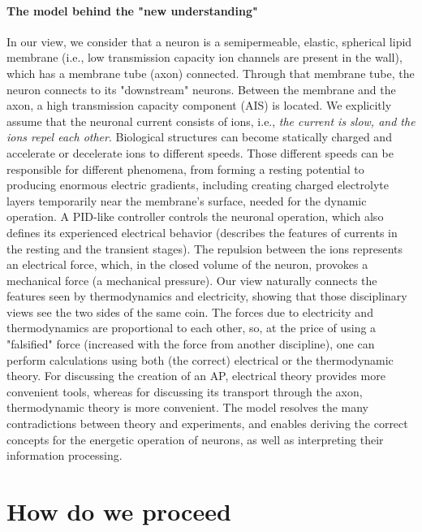 \paragraph*{The model behind the "new understanding"}
In our view, we consider that a neuron is a semipermeable, elastic, spherical lipid membrane
(i.e., low transmission capacity ion channels are present in the wall), which has a membrane tube (axon) connected.
Through that membrane tube, the neuron connects to its "downstream" neurons. Between the membrane and the axon, a high transmission capacity component (\gls{AIS}) is located.
We explicitly assume that the neuronal current consists of ions, i.e., \textit{the current is slow, and the ions repel each other}.
Biological structures can become statically charged and accelerate or decelerate ions to different speeds.
Those different speeds can be responsible for different phenomena,
from forming a resting potential to producing enormous electric gradients, including creating charged electrolyte layers temporarily near the membrane's surface, needed for the dynamic operation.
A \gls{PID}-like controller controls the neuronal operation, which also defines its experienced electrical behavior
(describes the features of currents in the resting and the transient stages).
The repulsion between the ions 
represents an electrical force, which, in the closed volume of the neuron, provokes a mechanical force (a mechanical pressure).
Our view naturally connects the features seen by thermodynamics
and electricity, showing that those disciplinary views see
the two sides of the same coin. The forces due to electricity and thermodynamics are proportional to each other, so, at the price of
using a "falsified" force (increased with the force from another discipline), one can perform calculations using both (the correct)
electrical or the thermodynamic theory.
For discussing the creation of an \gls{AP}, electrical theory provides more convenient tools, whereas for discussing its transport through the axon, thermodynamic theory is more convenient.
The model resolves the many contradictions between theory and
experiments, and enables deriving the correct concepts for
the energetic operation of neurons, as well as interpreting
their information processing.
 

\section*{How do we proceed\label{sec:State-HowWeProceed}}

